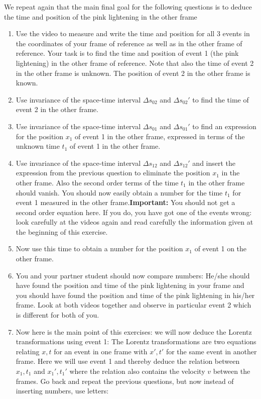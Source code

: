 {\begin{multicols}{2}
We repeat again that the main final goal for the following questions is to deduce the time and position of the pink lightening in the other frame

\begin{enumerate}
\item Use the video to measure and write the time and position for all 3 events in the coordinates of your frame of reference as well as in the other frame of reference. Your task is to find the time and position of event 1 (the pink lightening) in the other frame of reference. Note that also the time of event 2 in the other frame is unknown. The position of event 2 in the other frame is known.
\item Use invariance of the space-time interval $\Delta s_{02}$ and $\Delta s_{02}'$ to find the time of event 2 in the other frame.
\item Use invariance of the space-time interval $\Delta s_{01}$ and $\Delta s_{01}'$ to find an expression for the position $x_1$ of event 1 in the other frame, expressed in terms of the unknown time $t_1$ of event 1 in the other frame.
\item Use invariance of the space-time interval $\Delta s_{12}$ and $\Delta s_{12}'$ and insert the expression from the previous question to eliminate the position $x_1$ in the other frame. Also the second order terms of the time $t_1$ in the other frame should vanish. You should now easily obtain a number for the time $t_1$ for event 1 measured in the other frame.{\bf Important:} You should not get a second order equation here. If you do, you have got one of the events wrong: look carefully at the videos again and read carefully the information given at the beginning of this exercise.
\item Now use this time to obtain a number for the position $x_1$ of event 1 on the other frame.
\item You and your partner student should now compare numbers: He/she should have found the position and time of the pink lightening in your frame and you should have found the position and time of the pink lightening in his/her frame. Look at both videos together and observe in particular event 2 which is different for both of you.
\item Now here is the main point of this exercises: we will now deduce the Lorentz transformations using event 1: The Lorentz transformations are two equations relating $x,t$ for an event in one frame with $x',t'$ for the same event in another frame. Here we will use event 1 and thereby deduce the relation between $x_1,t_1$ and $x_1',t_1'$ where the relation also contains the velocity $v$ between the frames. Go back and repeat the previous questions, but now instead of inserting numbers, use letters:

\end{enumerate}
\end{multicols}}
